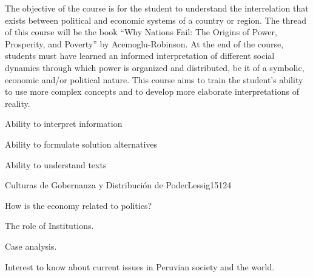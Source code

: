 \begin{syllabus}


\begin{justification}
The objective of the course is for the student to understand the interrelation that exists between political and economic systems of a country or region. The thread of this course will be the book “Why Nations Fail: The Origins of Power, Prosperity, and Poverty” by Acemoglu-Robinson.
At the end of the course, students must have learned an informed interpretation of different social dynamics through which power is organized and distributed, be it of a symbolic, economic and/or political nature. This course aims to train the student’s ability to use more complex concepts and to develop more elaborate interpretations of reality. 
\end{justification}

\begin{goals}
\item Ability to interpret information
\item Ability to formulate solution alternatives
\item Ability to understand texts 
\end{goals}

\begin{outcomes}
    \item {}
    \item {}
    \item {}
    
\end{outcomes}

\begin{competences}
    \item {}
    \item {}
    \item {}
    \item {}
\end{competences}

\begin{unit}{Culturas de Gobernanza y Distribución de Poder}{}{Lessig15}{12}{4}
   \begin{topics}
      \item How is the economy related to politics?
      \item The role of Institutions.
      \item Case analysis.
   \end{topics}
   \begin{learningoutcomes}
      \item Interest to know about current issues in Peruvian society and the world.
   \end{learningoutcomes}
\end{unit}

\begin{coursebibliography}
\end{coursebibliography}

\end{syllabus}

